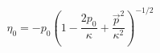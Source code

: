 \begin{equation}
 \eta_{0}=-p_{0}\left(1-\frac{2p_{0}}{\kappa}+\frac{\vec{p}^{2}}
 {\kappa^{2}} \right)^{-1/2}
\end{equation}

